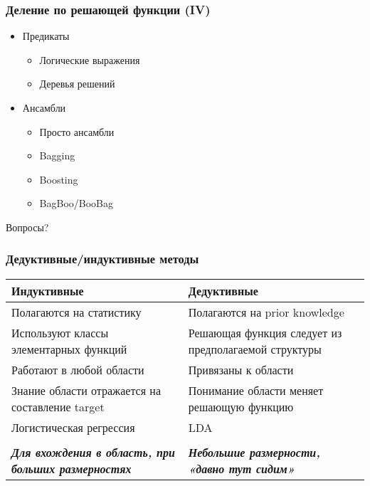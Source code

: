 \documentclass[14pt, fleqn, xcolor={dvipsnames, table}]{beamer}
\begin{document}
\begin{frame}
\frametitle{Деление по решающей функции (IV)}
\begin{itemize}
\item Предикаты
	\begin{itemize}
	\item Логические выражения
	\item Деревья решений
	\end{itemize}
\item Ансамбли
	\begin{itemize}
	\item Просто ансамбли 
	\item Bagging
	\item Boosting
	\item BagBoo/BooBag
	\end{itemize}
\end{itemize}
\end{frame}

\begin{frame}
\begin{center}\huge
Вопросы?
\end{center}
\end{frame}

\renewcommand{\arraystretch}{1.5}

\begin{frame}
\frametitle{Дедуктивные/индуктивные методы}
\begin{center}
\footnotesize
\begin{tabular}{p{}|p{}}
\rowcolor{Blue!20}
\small Индуктивные & \small Дедуктивные \\
\hline 
Полагаются на статистику & Полагаются на prior knowledge \\ 
Используют классы элементарных функций & Решающая функция следует из предполагаемой структуры \\
Работают в любой области & Привязаны к области \\ 
Знание области отражается на составление target & Понимание области меняет решающую функцию \\
Логистическая регрессия & LDA \\
&\\
\bf \em Для вхождения в область, при больших размерностях & \bf \em Небольшие размерности, «давно тут сидим» \\
\end{tabular}
\end{center}
\end{frame}
\end{document}
